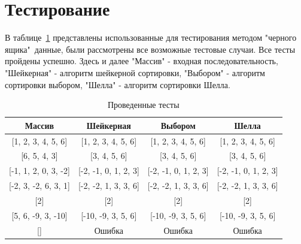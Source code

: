 \documentclass[12pt]{report}
\begin{document}
    \section{Тестирование}
    В таблице~\ref{tab:tests} представлены использованные для тестирования методом "черного ящика"\ данные,
    были рассмотрены все возможные тестовые случаи. Все тесты пройдены успешно.
    Здесь и далее
    "Массив" - входная последовательность,
    "Шейкерная" - алгоритм шейкерной сортировки,
    "Выбором" - алгоритм сортировки выбором,
    "Шелла" - алгоритм сортировки Шелла.

    \begin{table}[H]
        \begin{center}
            \captionsetup{justification=raggedright, singlelinecheck=false}
            \caption[]{\label{tab:tests} Проведенные тесты}

            \begin{tabular}{|c|c|c|c|}
                \hline
                \rule[-1ex]{0pt}{2.5ex} Массив               & Шейкерная            & Выбором              & Шелла                \\
                \hline
                \rule[-1ex]{0pt}{2.5ex} [1, 2, 3, 4, 5, 6]   & [1, 2, 3, 4, 5, 6]   & [1, 2, 3, 4, 5, 6] & [1, 2, 3, 4, 5, 6] \\
                \hline
                \rule[-1ex]{0pt}{2.5ex} [6, 5, 4, 3]         & [3, 4, 5, 6]         & [3, 4, 5, 6]         & [3, 4, 5, 6]         \\
                \hline
                \rule[-1ex]{0pt}{2.5ex} [-1, 1, 2, 0, 3, -2] & [-2, -1, 0, 1, 2, 3] & [-2, -1, 0, 1, 2, 3] & [-2, -1, 0, 1, 2, 3] \\
                \hline
                \rule[-1ex]{0pt}{2.5ex} [-2, 3, -2, 6, 3, 1] & [-2, -2, 1, 3, 3, 6] & [-2, -2, 1, 3, 3, 6] & [-2, -2, 1, 3, 3, 6] \\
                \hline
                \rule[-1ex]{0pt}{2.5ex} [2]                  & [2]                  & [2]                  & [2]                  \\
                \hline
                \rule[-1ex]{0pt}{2.5ex} [5, 6, -9, 3, -10]   & [-10, -9, 3, 5, 6]   & [-10, -9, 3, 5, 6] & [-10, -9, 3, 5, 6] \\
                \hline
                \rule[-1ex]{0pt}{2.5ex} []                   & Ошибка               & Ошибка               & Ошибка               \\
                \hline

            \end{tabular}
        \end{center}
    \end{table}
\end{document}
